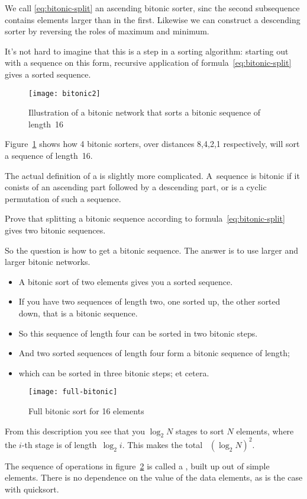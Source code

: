 We call \eqref{eq:bitonic-split} an ascending bitonic sorter, sinc the
second subsequence contains elements larger than in the
first. Likewise we can construct a descending sorter by reversing the
roles of maximum and minimum.

It's not hard to imagine that this is a step in a sorting algorithm:
starting out with a sequence on this form, recursive application 
of formula~\eqref{eq:bitonic-split} gives a sorted sequence.
\begin{figure}[h]
\texttt{[image: bitonic2]}
\caption{Illustration of a  bitonic network that sorts a bitonic sequence of length~16}
\label{fig:bitonic8421}
\end{figure}
Figure~\ref{fig:bitonic8421} shows how 4 bitonic sorters, over
distances 8,4,2,1 respectively, will sort a sequence of length~16.

The actual definition of a  is slightly more
complicated. A~sequence is bitonic if it conists of an ascending part followed 
by a descending part, or is a cyclic permutation of such a sequence.
\begin{exercise}
Prove that splitting a bitonic sequence according to
formula~\eqref{eq:bitonic-split} gives two bitonic sequences.
\end{exercise}

So the question is how to get a bitonic sequence. The answer is to
use larger and larger bitonic networks.
\begin{itemize}
\item A bitonic sort of two elements gives you a sorted sequence.
\item If you have two sequences of length two, one sorted up, the
  other sorted down, that is a bitonic sequence.
\item So this sequence of length four can be sorted in two bitonic steps.
\item And two sorted sequences of length four form a bitonic sequence of length;
\item which can be sorted in three bitonic steps; et cetera.
\end{itemize}
\begin{figure}[ht]
  \texttt{[image: full-bitonic]}
  \caption{Full bitonic sort for 16 elements}
  \label{fig:full-bitonic}
\end{figure}
From this description you see that you $\log_2N$ stages to sort $N$
elements, where the $i$-th stage is of length~$\log_2i$. This makes
the total ~$(\log_2N)^2$.

The sequence of operations in figure~\ref{fig:full-bitonic}
is called a , built up out of simple 
 elements. There is no dependence 
on the value of the data elements, as is the case with quicksort.



